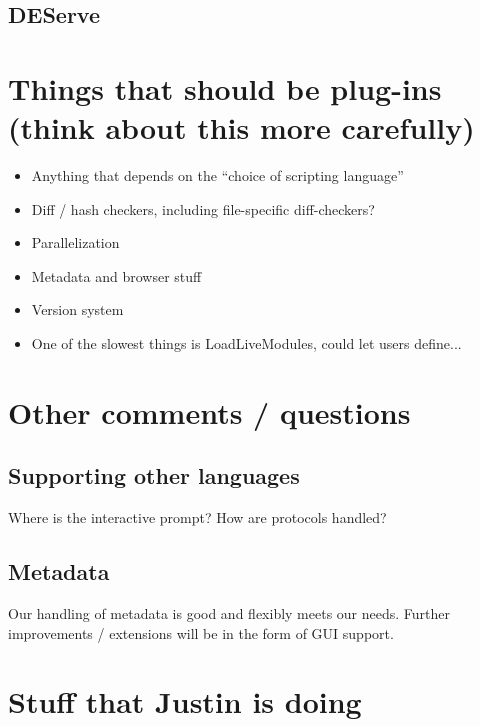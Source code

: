 \documentclass[11pt]{article}
\begin{document}
\subsection{DEServe}


\section{Things that should be plug-ins (think about this more carefully)}
\begin{itemize}
	\item{Anything that depends on the ``choice of scripting language''}
	\item{Diff / hash checkers, including file-specific diff-checkers?}
	\item{Parallelization}
	\item{Metadata and browser stuff}
	\item{Version system}
	\item{One of the slowest things is LoadLiveModules, could let users define...}
\end{itemize}

\section{Other comments / questions}

\subsection{Supporting other languages}
Where is the interactive prompt?  How are protocols handled?
	
\subsection{Metadata}
Our handling of metadata is good and flexibly meets our needs.  
Further improvements / extensions will be in the form of GUI support.


\section{Stuff that Justin is doing}
\end{document}
